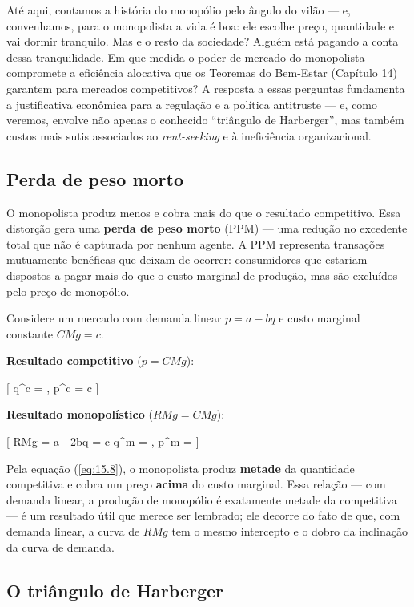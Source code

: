 \documentclass[11pt,twoside,openright]{book}
\begin{document}
Até aqui, contamos a história do monopólio pelo ângulo do vilão --- e,
convenhamos, para o monopolista a vida é boa: ele escolhe preço,
quantidade e vai dormir tranquilo. Mas e o resto da sociedade? Alguém
está pagando a conta dessa tranquilidade. Em que medida o poder de
mercado do monopolista compromete a eficiência alocativa que os Teoremas
do Bem-Estar (Capítulo 14) garantem para mercados competitivos? A
resposta a essas perguntas fundamenta a justificativa econômica para a
regulação e a política antitruste --- e, como veremos, envolve não
apenas o conhecido ``triângulo de Harberger'', mas também custos mais
sutis associados ao \emph{rent-seeking} e à ineficiência organizacional.

\subsection{Perda de peso morto}\label{perda-de-peso-morto}

O monopolista produz menos e cobra mais do que o resultado competitivo.
Essa distorção gera uma \textbf{perda de peso morto} (PPM) --- uma
redução no excedente total que não é capturada por nenhum agente. A PPM
representa transações mutuamente benéficas que deixam de ocorrer:
consumidores que estariam dispostos a pagar mais do que o custo marginal
de produção, mas são excluídos pelo preço de monopólio.

Considere um mercado com demanda linear \(p = a - bq\) e custo marginal
constante \(CMg = c\).

\textbf{Resultado competitivo} (\(p = CMg\)):

{[} q\^{}c = , \quad p\^{}c = c {]}

\textbf{Resultado monopolístico} (\(RMg = CMg\)):

{[} RMg = a - 2bq = c \implies q\^{}m = , \quad p\^{}m =
 \label{eq:15.8}  {]}

Pela equação (\ref{eq:15.8}), o monopolista produz \textbf{metade} da
quantidade competitiva e cobra um preço \textbf{acima} do custo
marginal. Essa relação --- com demanda linear, a produção de monopólio é
exatamente metade da competitiva --- é um resultado útil que merece ser
lembrado; ele decorre do fato de que, com demanda linear, a curva de
\(RMg\) tem o mesmo intercepto e o dobro da inclinação da curva de
demanda.

\subsection{O triângulo de Harberger}\label{o-triuxe2ngulo-de-harberger}
\end{document}
